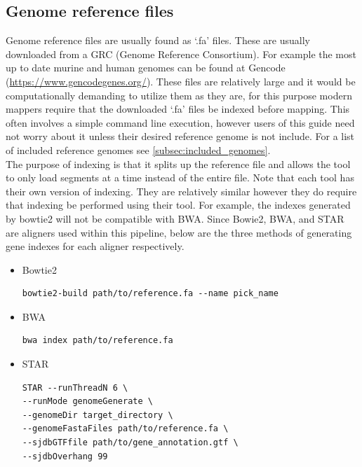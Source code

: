 \subsection{Genome reference files}
Genome reference files are usually found as `.fa' files. These are usually downloaded from a GRC (Genome Reference Consortium). For example the most up to date murine and human genomes can be found at Gencode (\url{https://www.gencodegenes.org/}). These files are relatively large and it would be computationally demanding to utilize them as they are, for this purpose modern mappers require that the downloaded `.fa' files be indexed before mapping. This often involves a simple command line execution, however users of this guide need not worry about it unless their desired reference genome is not include. For a list of included reference genomes see \autoref{subsec:included_genomes}.\\
The purpose of indexing is that it splits up the reference file and allows the tool to only load segments at a time instead of the entire file. Note that each tool has their own version of indexing. They are relatively similar however they do require that indexing be performed using their tool. For example, the indexes generated by bowtie2 will not be compatible with BWA. Since Bowie2, BWA, and STAR are aligners used within this pipeline, below are the three methods of generating gene indexes for each aligner respectively.

\begin{itemize}
\item Bowtie2
\begin{lstlisting}
bowtie2-build path/to/reference.fa --name pick_name
\end{lstlisting}
\item BWA
\begin{lstlisting}
bwa index path/to/reference.fa
\end{lstlisting}
\item STAR
\begin{lstlisting}
STAR --runThreadN 6 \
--runMode genomeGenerate \
--genomeDir target_directory \
--genomeFastaFiles path/to/reference.fa \
--sjdbGTFfile path/to/gene_annotation.gtf \
--sjdbOverhang 99
\end{lstlisting}


\end{itemize}

